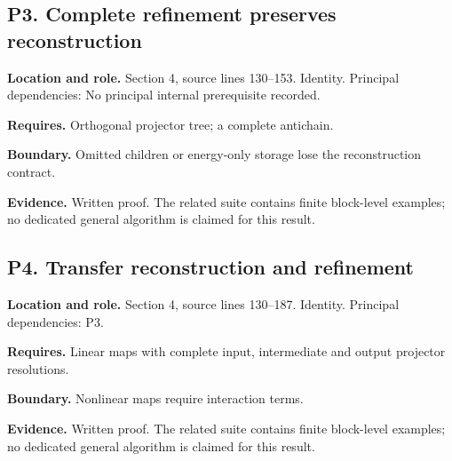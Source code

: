 \documentclass[11pt,oneside,openany]{book}
\numberwithin{equation}{section}
\begin{document}
\par\noindent\begin{minipage}{\textwidth}
\subsection{P3. Complete refinement preserves
reconstruction}\label{LSMRegister:p3.-complete-refinement-preserves-reconstruction}

\textbf{Location and role.} Section 4, source lines 130--153. Identity.
Principal dependencies: No principal internal prerequisite recorded.

\textbf{Requires.} Orthogonal projector tree; a complete antichain.

\textbf{Boundary.} Omitted children or energy-only storage lose the
reconstruction contract.

\textbf{Evidence.} Written proof. The related suite contains finite
block-level examples; no dedicated general algorithm is claimed for this
result.
\end{minipage}\par\medskip

\par\noindent\begin{minipage}{\textwidth}
\subsection{P4. Transfer reconstruction and
refinement}\label{LSMRegister:p4.-transfer-reconstruction-and-refinement}

\textbf{Location and role.} Section 4, source lines 130--187. Identity.
Principal dependencies: P3.

\textbf{Requires.} Linear maps with complete input, intermediate and
output projector resolutions.

\textbf{Boundary.} Nonlinear maps require interaction terms.

\textbf{Evidence.} Written proof. The related suite contains finite
block-level examples; no dedicated general algorithm is claimed for this
result.
\end{minipage}\par\medskip
\end{document}
